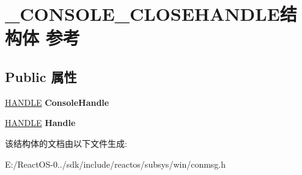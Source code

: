 \hypertarget{struct___c_o_n_s_o_l_e___c_l_o_s_e_h_a_n_d_l_e}{}\section{\+\_\+\+C\+O\+N\+S\+O\+L\+E\+\_\+\+C\+L\+O\+S\+E\+H\+A\+N\+D\+L\+E结构体 参考}
\label{struct___c_o_n_s_o_l_e___c_l_o_s_e_h_a_n_d_l_e}
\subsection*{Public 属性}
\begin{DoxyCompactItemize}
\item 
\mbox{\label{struct___c_o_n_s_o_l_e___c_l_o_s_e_h_a_n_d_l_e_a3e96687af9e30a1618cbc223f7b3c2b0}} 
\hyperlink{interfacevoid}{H\+A\+N\+D\+LE} {\bfseries Console\+Handle}
\item 
\mbox{\label{struct___c_o_n_s_o_l_e___c_l_o_s_e_h_a_n_d_l_e_a44408146ce7e48930966ac32405a30ac}} 
\hyperlink{interfacevoid}{H\+A\+N\+D\+LE} {\bfseries Handle}
\end{DoxyCompactItemize}


该结构体的文档由以下文件生成\+:\begin{DoxyCompactItemize}
\item 
E\+:/\+React\+O\+S-\/0../sdk/include/reactos/subsys/win/conmsg.\+h\end{DoxyCompactItemize}
